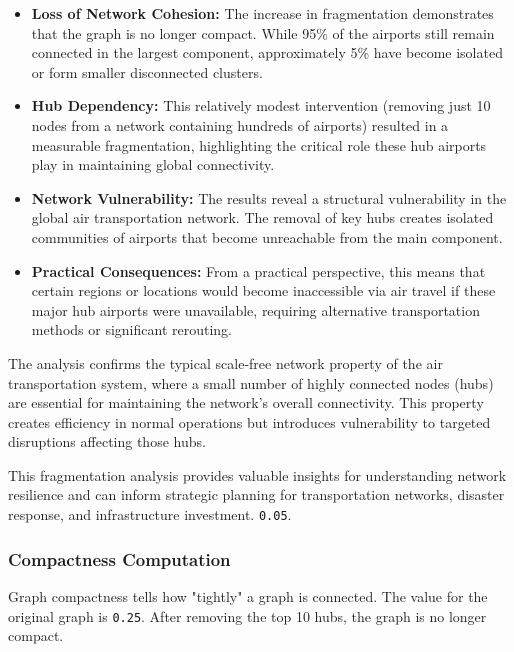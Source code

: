\documentclass[12pt]{article}
\begin{document}
    \begin{itemize}
        \item \textbf{Loss of Network Cohesion:} The increase in fragmentation demonstrates that the graph is no longer compact. While 95\% of the airports still remain connected in the largest component, approximately 5\% have become isolated or form smaller disconnected clusters.
        
        \item \textbf{Hub Dependency:} This relatively modest intervention (removing just 10 nodes from a network containing hundreds of airports) resulted in a measurable fragmentation, highlighting the critical role these hub airports play in maintaining global connectivity.
        
        \item \textbf{Network Vulnerability:} The results reveal a structural vulnerability in the global air transportation network. The removal of key hubs creates isolated communities of airports that become unreachable from the main component.
        
        \item \textbf{Practical Consequences:} From a practical perspective, this means that certain regions or locations would become inaccessible via air travel if these major hub airports were unavailable, requiring alternative transportation methods or significant rerouting.
    \end{itemize}
    
    The analysis confirms the typical scale-free network property of the air transportation system, where a small number of highly connected nodes (hubs) are essential for maintaining the network's overall connectivity. This property creates efficiency in normal operations but introduces vulnerability to targeted disruptions affecting those hubs.
    
    This fragmentation analysis provides valuable insights for understanding network resilience and can inform strategic planning for transportation networks, disaster response, and infrastructure investment.
    \texttt{0.05}.

    \subsubsection{Compactness Computation}
    Graph compactness tells how "tightly" a graph is connected. The value for the original graph is \texttt{0.25}. After removing the top 10 hubs, the graph is no longer compact.
\end{document}

